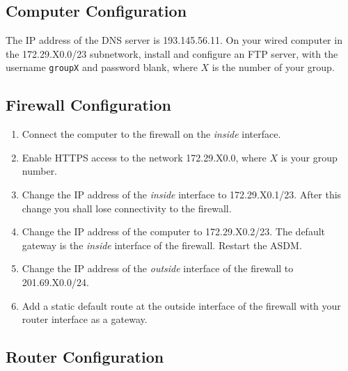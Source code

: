 \subsection{Computer Configuration}

The IP address of the DNS server is 193.145.56.11. On your wired computer in the 172.29.X0.0/23 subnetwork, install and configure an FTP server, with the username \texttt{groupX} and password blank, where $X$ is the number of your group.

\subsection{Firewall Configuration}

\begin{enumerate}
\item Connect the computer to the firewall on the \emph{inside} interface.
\item Enable HTTPS access to the network 172.29.X0.0, where $X$ is your group number.
\item Change the IP address of the \emph{inside} interface to 172.29.X0.1/23. After this change you shall lose connectivity to the firewall.
\item Change the IP address of the computer to 172.29.X0.2/23. The default gateway is the \emph{inside} interface of the firewall. Restart the ASDM.
\item Change the IP address of the \emph{outside} interface of the firewall to 201.69.X0.0/24.
\item Add a static default route at the outside interface of the firewall with your router interface as a gateway.
\end{enumerate}

\subsection{Router Configuration}

